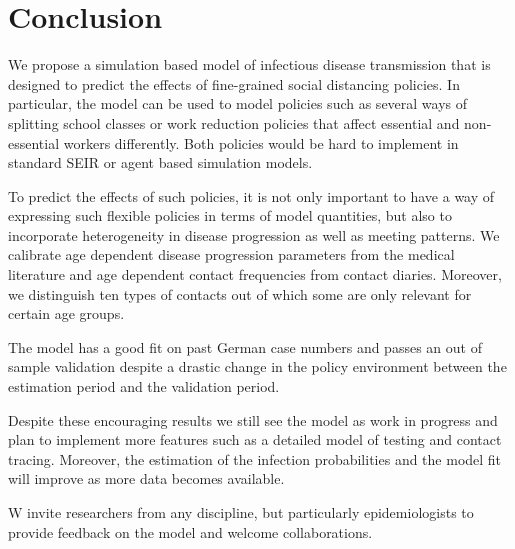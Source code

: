 \section{Conclusion}
\label{sec:conclusion}

We propose a simulation based model of infectious disease transmission that is designed
to predict the effects of fine-grained social distancing policies. In particular, the
model can be used to model policies such as several ways of splitting school classes or
work reduction policies that affect essential and non-essential workers differently.
Both policies would be hard to implement in standard SEIR or agent based simulation
models.

To predict the effects of such policies, it is not only important to have a way of
expressing such flexible policies in terms of model quantities, but also to incorporate
heterogeneity in disease progression as well as meeting patterns. We calibrate age
dependent disease progression parameters from the medical literature and age dependent
contact frequencies from contact diaries. Moreover, we distinguish ten types of contacts
out of which some are only relevant for certain age groups.

The model has a good fit on past German case numbers and passes an out of sample
validation despite a drastic change in the policy environment between the estimation
period and the validation period.

Despite these encouraging results we still see the model as work in progress and plan to
implement more features such as a detailed model of testing and contact tracing.
Moreover, the estimation of the infection probabilities and the model fit will improve
as more data becomes available.

W invite researchers from any discipline, but particularly epidemiologists to provide
feedback on the model and welcome collaborations.
